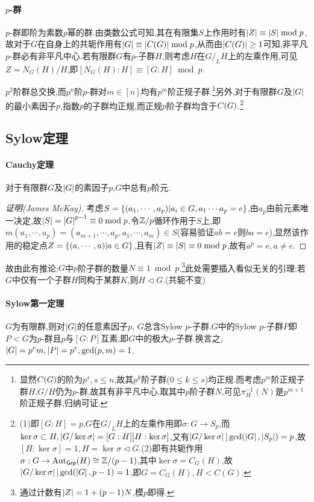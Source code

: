 \documentclass[11pt]{article} %
\begin{document}
\paragraph{$p$-群}
$p$-群即阶为素数$p$幂的群.由类数公式可知,其在有限集$S$上作用时有$\left|Z\right|\equiv\left|S\right|\bmod p$,故对于$G$在自身上的共轭作用有$\left|G\right|\equiv \left|C(G)\right|\bmod p$,从而由$\left|C(G)\right|\geq 1$可知,非平凡$p$-群必有非平凡中心.若有限群$G$有$p$-子群$H$,则考虑$H$在$G/_LH$上的左乘作用,可见$Z=N_G(H)/H$,即$[N_G(H):H]\equiv [G:H]\bmod p$.

$p^2$阶群总交换,而$p^n$阶$p$-群对$m\in [n]$均有$p^m$阶正规子群.\footnote{显然$C(G)$的阶为$p^s, s\leq n$,故其$p^k$阶子群($0\leq k\leq s$)均正规.而考虑$p^m$阶正规子群$H$,$G/H$仍为$p$-群,故其有非平凡中心.取其中$p$阶子群$N$,可见$\pi_H^{-1}(N)$是$p^{m+1}$阶正规子群,归纳可证.}另外,对于有限群$G$及$\left|G\right|$的最小素因子$p$,指数$p$的子群均正规,而正规$p$阶子群均含于$C(G)$.\footnote{(1)即$[G:H]=p$,$G$在$G/_L H$上的左乘作用即$\sigma:G\to S_p$,而$\ker\sigma\subset H, \left|G/\ker\sigma\right|=[G:H][H:\ker\sigma]$,又有$\left|G/\ker\sigma\right||\gcd(\left|G\right|,\left|S_p\right|)=p$,故$[H:\ker\sigma]=1, H=\ker\sigma\lhd G$.(2)即有共轭作用$\sigma:G\to\operatorname{Aut}_{\mathsf{Grp}}(H)\cong \mathbb{Z}/(p-1)$,其中$\ker\sigma=C_G(H)$,故$\left|G/\ker\sigma\right||\gcd(\left|G\right|,p-1)=1$,即$G=C_G(H), H<C(G)$.}

\subsection{Sylow定理}
\paragraph{Cauchy定理}
对于有限群$G$及$\left|G\right|$的素因子$p$,$G$中总有$p$阶元.

\begin{proof}[证明(James McKay)]
    考虑$S=\left\{(a_1,\cdots,a_p)|a_i\in G, a_1\cdots a_p=e\right\}$,由$a_p$由前元素唯一决定,故$\left|S\right|=\left|G\right|^{p-1}\equiv 0\bmod p$.令$\mathbb{Z}/p$循环作用于$S$上,即$m(a_1,\cdots,a_p)=(a_{m+1},\cdots,a_p,a_1,\cdots,a_m)\in S$(容易验证$ab=e$则$ba=e$),显然该作用的稳定点$Z=\left\{(a,\cdots,a)|a\in G\right\}$,且有$\left|Z\right|\equiv\left|S\right|\equiv 0\bmod p$,故有$a^p=e, a\neq e$.
\end{proof}

故由此有推论:$G$中$p$阶子群的数量$N\equiv 1\bmod p$.\footnote{通过计数有$\left|Z\right|=1+(p-1)N$,模$p$即得.}此处需要插入看似无关的引理:若$G$中仅有一个子群$H$同构于某群$K$,则$H\lhd G$.(共轭不变)

\paragraph{Sylow第一定理}
$G$为有限群,则对$\left|G\right|$的任意素因子$p$, $G$总含Sylow $p$-子群.$G$中的Sylow $p$-子群$P$即$P<G$为$p$-群且$p$与$[G:P]$互素,即$G$中的极大$p$-子群.换言之,$\left|G\right|=p^rm, \left|P\right|=p^r, \gcd(p,m)=1$.
\end{document}
